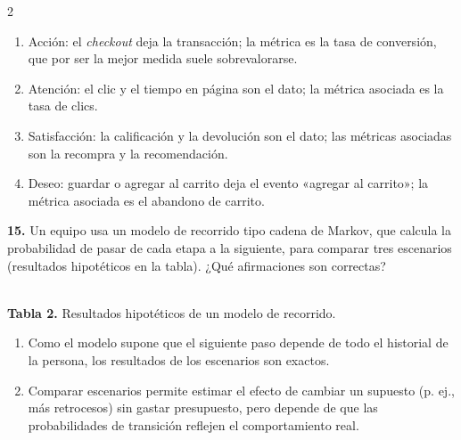 \documentclass[10pt,letterpaper]{article}
\newcommand{\cas}{\framebox[1.0em]{\rule{0pt}{1.05ex}}}
\begin{document}
\begin{multicols}{2}
\begin{minipage}[t]{\columnwidth}
\begin{enumerate}[label=\cas\ \alph*),leftmargin=2.3em,itemsep=1.2pt,topsep=1pt,parsep=0pt,partopsep=0pt]
\item Acción: el \textit{checkout} deja la transacción; la métrica es la tasa de conversión, que por ser la mejor medida suele sobrevalorarse.
\item Atención: el clic y el tiempo en página son el dato; la métrica asociada es la tasa de clics.
\item Satisfacción: la calificación y la devolución son el dato; las métricas asociadas son la recompra y la recomendación.
\item Deseo: guardar o agregar al carrito deja el evento «agregar al carrito»; la métrica asociada es el abandono de carrito.
\end{enumerate}\end{minipage}\par\vspace{3pt}
\begin{minipage}[t]{\columnwidth}\noindent\textbf{15.} Un equipo usa un modelo de recorrido tipo cadena de Markov, que calcula la probabilidad de pasar de cada etapa a la siguiente, para comparar tres escenarios (resultados hipotéticos en la tabla). ¿Qué afirmaciones son correctas?
\begin{center}\\[1pt]{\tiny\textbf{Tabla 2.} Resultados hipotéticos de un modelo de recorrido.}\end{center}
\vspace{1pt}\begin{enumerate}[label=\cas\ \alph*),leftmargin=2.3em,itemsep=1.2pt,topsep=1pt,parsep=0pt,partopsep=0pt]
\item Como el modelo supone que el siguiente paso depende de todo el historial de la persona, los resultados de los escenarios son exactos.
\item Comparar escenarios permite estimar el efecto de cambiar un supuesto (p. ej., más retrocesos) sin gastar presupuesto, pero depende de que las probabilidades de transición reflejen el comportamiento real.

\end{enumerate}
\end{minipage}
\end{multicols}
\end{document}

